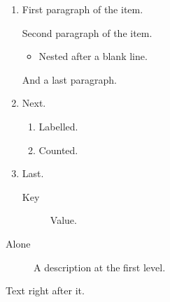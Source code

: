 \documentclass{beamer}
\begin{document}
\begin{frame}
\begin{enumerate}
\item First paragraph of the item.

Second paragraph of the item.

\begin{itemize}
\item Nested after a blank line.
\end{itemize}

And a last paragraph.
\item Next.
\begin{enumerate}
\item[(a)] Labelled.
\item Counted.
\end{enumerate}
\item Last.
\begin{description}
\item[Key] Value.
\end{description}
\end{enumerate}
\begin{description}
\item[Alone] A description at the first level.
\end{description}
Text right after it.
\end{frame}
\end{document}
